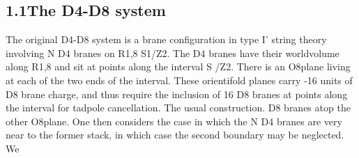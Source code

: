 \documentclass{article}
\begin{document}
\subsection*{1.1The D4-D8 system}


The original D4-D8 system is a brane configuration in type I' string theory involving N D4
branes on R1,8  S1/Z2. The D4 branes have their worldvolume along R1,8 and sit at points
along the interval S /Z2. There is an O8plane living at each of the two ends of the interval.
These orientifold planes carry -16 units of D8 brane charge, and thus require the inclusion
of 16 D8 branes at points along the interval for tadpole cancellation. The usual construction.
D8 branes atop the other O8plane. One then considers the case in which the N D4 branes
are very near to the former stack, in which case the second boundary may be neglected. We
\end{document}
